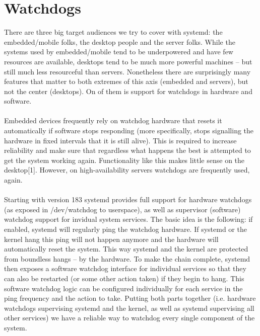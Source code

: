 \documentclass[titlepage]{article}
\begin{document}
\section{Watchdogs}
There are three big target audiences we try to cover with systemd: the embedded/mobile folks, the desktop people and the server folks. While the systems used by embedded/mobile tend to be underpowered and have few resources are available, desktops tend to be much more powerful machines -- but still much less resourceful than servers. Nonetheless there are surprisingly many features that matter to both extremes of this axis (embedded and servers), but not the center (desktops). On of them is support for watchdogs in hardware and software.
\\
\\
Embedded devices frequently rely on watchdog hardware that resets it automatically if software stops responding (more specifically, stops signalling the hardware in fixed intervals that it is still alive). This is required to increase reliability and make sure that regardless what happens the best is attempted to get the system working again. Functionality like this makes little sense on the desktop[1]. However, on high-availability servers watchdogs are frequently used, again.
\\
\\
Starting with version 183 systemd provides full support for hardware watchdogs (as exposed in /dev/watchdog to userspace), as well as supervisor (software) watchdog support for invidual system services. The basic idea is the following: if enabled, systemd will regularly ping the watchdog hardware. If systemd or the kernel hang this ping will not happen anymore and the hardware will automatically reset the system. This way systemd and the kernel are protected from boundless hangs -- by the hardware. To make the chain complete, systemd then exposes a software watchdog interface for individual services so that they can also be restarted (or some other action taken) if they begin to hang. This software watchdog logic can be configured individually for each service in the ping frequency and the action to take. Putting both parts together (i.e. hardware watchdogs supervising systemd and the kernel, as well as systemd supervising all other services) we have a reliable way to watchdog every single component of the system.
\end{document}
